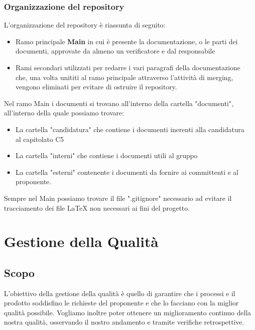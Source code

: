   \subsubsection{Organizzazione del repository}
  L'organizzazione del repository è riassunta di seguito:
  \begin{itemize}
      \item Ramo principale \textbf{Main} in cui è presente la documentazione, o le parti dei documenti, approvate da almeno un verificatore e dal responsabile
      \item Rami secondari utilizzati per redarre i vari paragrafi della documentazione che, una volta unititi al ramo principale attraverso l'attività di merging, vengono eliminati per evitare di ostruire il repository.
  \end{itemize}
  Nel ramo Main i documenti si trovano all'interno della cartella "documenti", all'interno della quale possiamo trovare:
  \begin{itemize}
      \item La cartella "candidatura" che contiene i documenti inerenti alla candidatura al capitolato C5
      \item La cartella "interni" che contiene i documenti utili al gruppo
      \item La cartella "esterni" contenente i documenti da fornire ai committenti e al proponente.
  \end{itemize}
  Sempre nel Main possiamo trovare il file ".gitignore" necessario ad evitare il tracciamento dei file \LaTeX{} non necessari ai fini del progetto.


\section{Gestione della Qualità}
\subsection{Scopo}
L'obiettivo della gestione della qualità è quello di garantire
che i processi e il prodotto soddisfino le richieste del proponente
e che lo facciano con la miglior qualità possibile.
\newline
Vogliamo inoltre poter ottenere un miglioramento continuo della nostra
qualità, osservando il nostro andamento e tramite verifiche retrospettive.

